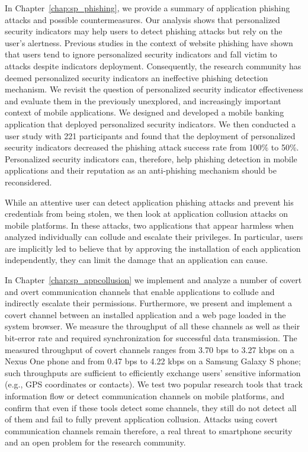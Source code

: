 In Chapter~\ref{chap:sp_phishing}, we provide a summary of application phishing attacks and possible countermeasures. Our analysis shows that personalized security indicators may help users to detect phishing attacks but rely on the user's alertness. Previous studies in the context of website phishing have shown that users tend to ignore personalized security indicators and fall victim to attacks despite indicators deployment. Consequently, the research community has deemed personalized security indicators an ineffective phishing detection mechanism. We revisit the question of personalized security indicator effectiveness and evaluate them in the previously unexplored, and increasingly important context of mobile applications. We designed and developed a mobile banking application that deployed personalized security indicators. We then conducted a user study with 221 participants and found that the deployment of personalized security indicators decreased the phishing attack success rate from 100\% to 50\%. Personalized security indicators can, therefore, help phishing detection in mobile applications and their reputation as an anti-phishing mechanism should be reconsidered.

While an attentive user can detect application phishing attacks and prevent his credentials from being stolen, we then look at application collusion attacks on mobile platforms. In these attacks, two applications that appear harmless when analyzed individually can collude and escalate their privileges. In particular, users are implicitly led to believe that by approving the installation of each application independently, they can limit the damage that an application can cause. 

In Chapter~\ref{chap:sp_appcollusion} we implement and analyze a number of covert and overt communication channels that enable applications to collude and indirectly escalate their permissions. Furthermore, we present and implement a covert channel between an installed application and a web page loaded in the system browser. We measure the throughput of all these channels as well as their bit-error rate and required synchronization for successful data transmission. The measured throughput of covert channels ranges from 3.70 bps to 3.27 kbps on a Nexus One phone and from 0.47 bps to 4.22 kbps on a Samsung Galaxy S phone; such throughputs are sufficient to efficiently exchange users' sensitive information (e.g., GPS coordinates or contacts). We test two popular research tools that track information flow or detect communication channels on mobile platforms, and confirm that even if these tools detect some channels, they still do not detect all of them and fail to fully prevent application collusion. Attacks using covert communication channels remain therefore, a real threat to smartphone security and an open problem for the research community.
